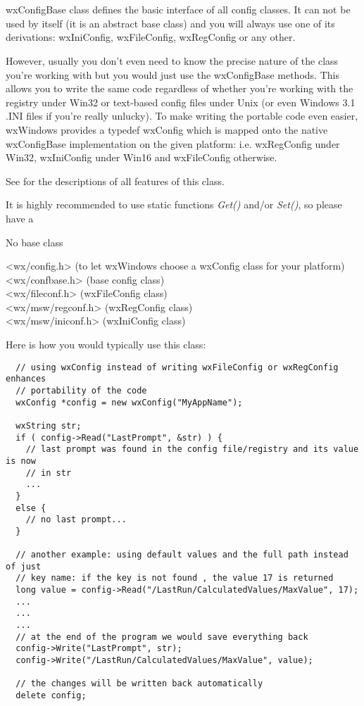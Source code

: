 \section{}\label{wxconfigbase}

wxConfigBase class defines the basic interface of all config classes. It can
not be used by itself (it is an abstract base class) and you will always use one
of its derivations: wxIniConfig, wxFileConfig, wxRegConfig or any other.

However, usually you don't even need to know the precise nature of the class
you're working with but you would just use the wxConfigBase methods. This
allows you to write the same code regardless of whether you're working with
the registry under Win32 or text-based config files under Unix (or even
Windows 3.1 .INI files if you're really unlucky). To make writing the portable
code even easier, wxWindows provides a typedef wxConfig
which is mapped onto the native wxConfigBase implementation on the given
platform: i.e. wxRegConfig under Win32, wxIniConfig under Win16 and
wxFileConfig otherwise.

See  for the descriptions of all
features of this class.

It is highly recommended to use static functions {\it Get()} and/or {\it Set()}, 
so please have a 


No base class


<wx/config.h> (to let wxWindows choose a wxConfig class for your platform)\\
<wx/confbase.h> (base config class)\\
<wx/fileconf.h> (wxFileConfig class)\\
<wx/msw/regconf.h> (wxRegConfig class)\\
<wx/msw/iniconf.h> (wxIniConfig class)


Here is how you would typically use this class:

\begin{verbatim}
  // using wxConfig instead of writing wxFileConfig or wxRegConfig enhances
  // portability of the code
  wxConfig *config = new wxConfig("MyAppName");

  wxString str;
  if ( config->Read("LastPrompt", &str) ) {
    // last prompt was found in the config file/registry and its value is now
    // in str
    ...
  }
  else {
    // no last prompt...
  }

  // another example: using default values and the full path instead of just
  // key name: if the key is not found , the value 17 is returned
  long value = config->Read("/LastRun/CalculatedValues/MaxValue", 17);
  ...
  ...
  ...
  // at the end of the program we would save everything back
  config->Write("LastPrompt", str);
  config->Write("/LastRun/CalculatedValues/MaxValue", value);

  // the changes will be written back automatically
  delete config;
\end{verbatim}

